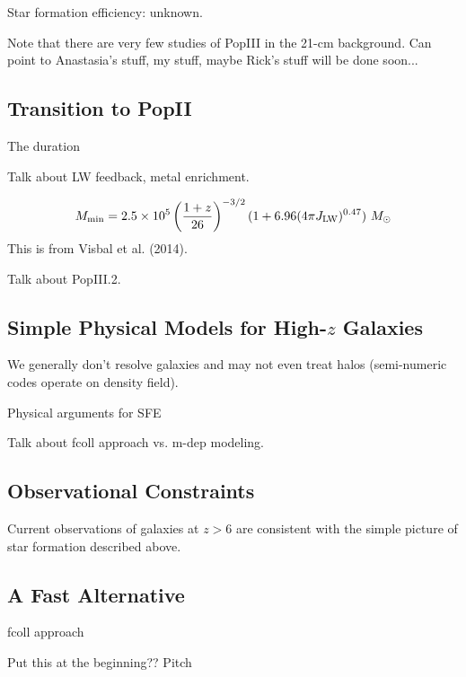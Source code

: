 Star formation efficiency: unknown.


{\color{red} Note that there are very few studies of PopIII in the 21-cm background.} Can point to Anastasia's stuff, my stuff, maybe Rick's stuff will be done soon...


\subsection{Transition to PopII} \label{sec:PopIII2PopII}
The duration 

Talk about LW feedback, metal enrichment.

\begin{equation}
	M_{\min} = 2.5 \times 10^5 \left(\frac{1+z}{26} \right)^{-3/2} (1 + 6.96(4\pi \JLW)^{0.47})  \ \Msun
\end{equation}
This is from Visbal et al. (2014).


Talk about PopIII.2.





\subsection{Simple Physical Models for High-$z$ Galaxies} \label{sec:galaxies}




We generally don't resolve galaxies and may not even treat halos (semi-numeric codes operate on density field).


Physical arguments for SFE

Talk about fcoll approach vs. m-dep modeling. 


\subsection{Observational Constraints}
Current observations of galaxies at $z > 6$ are consistent with the simple picture of star formation described above. 



\subsection{A Fast Alternative}
fcoll approach

{\color{red} Put this at the beginning?? Pitch}



